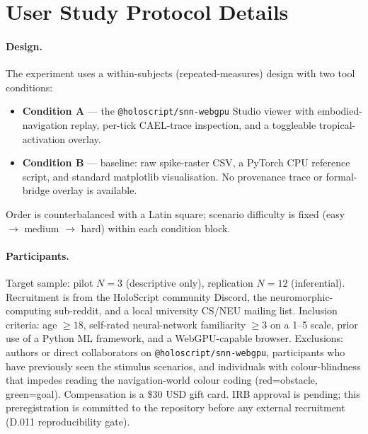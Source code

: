\documentclass[10pt]{article}
\makeatletter
\newcommand{\snnwebgpu}{\texttt{@holoscript/snn-webgpu}}
\makeatother
\begin{document}
\section{User Study Protocol Details}
\label{app:user-study-protocol}
\label{supp:user-study}

\paragraph{Design.}
The experiment uses a within-subjects (repeated-measures) design with
two tool conditions:
\begin{itemize}[leftmargin=*,topsep=2pt]
  \item \textbf{Condition A} — the \snnwebgpu{} Studio viewer with
    embodied-navigation replay, per-tick CAEL-trace inspection, and
    a toggleable tropical-activation overlay.
  \item \textbf{Condition B} — baseline: raw spike-raster CSV, a
    PyTorch CPU reference script, and standard matplotlib visualisation.
    No provenance trace or formal-bridge overlay is available.
\end{itemize}
Order is counterbalanced with a Latin square; scenario difficulty is
fixed (easy $\to$ medium $\to$ hard) within each condition block.

\paragraph{Participants.}
Target sample: pilot $N=3$ (descriptive only), replication $N=12$
(inferential).  Recruitment is from the HoloScript community Discord,
the neuromorphic-computing sub-reddit, and a local university CS/NEU
mailing list.  Inclusion criteria: age $\geq 18$, self-rated neural-network
familiarity $\geq 3$ on a 1--5 scale, prior use of a Python ML
framework, and a WebGPU-capable browser.  Exclusions: authors or
direct collaborators on \snnwebgpu{}, participants who have previously
seen the stimulus scenarios, and individuals with colour-blindness that
impedes reading the navigation-world colour coding (red=obstacle,
green=goal).  Compensation is a \$30 USD gift card.  IRB approval is
pending; this preregistration is committed to the repository before any
external recruitment (D.011 reproducibility gate).
\end{document}
